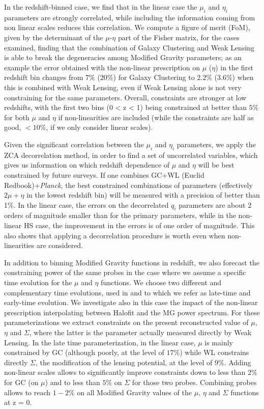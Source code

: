 In the redshift-binned case, we find that in the linear case the $\mu_i$ and $\eta_i$ parameters are strongly correlated, while including the information coming from non linear 
scales reduces this correlation. We compute a figure of merit (FoM), given by the determinant of the $\mu$-$\eta$ part of the Fisher matrix, for the cases examined, finding that 
the combination of Galaxy Clustering and Weak Lensing is able to break the degeneracies among Modified Gravity parameters; as an example the error obtained with the non-linear prescription on $\mu$ ($\eta$) in the first redshift bin changes 
from $7\%$ ($20\%$) for Galaxy Clustering to $2.2\%$ ($3.6\%$) when this is combined with Weak Lensing, even if Weak Lensing alone is not very constraining for the same parameters. 
Overall, constraints are stronger at low redshifts, with the first two bins (0 < z < 1) being constrained at better than $5\%$ for both $\mu$ and $\eta$ if non-linearities are included (while the constraints are half as good, $<10\%$, if we only consider linear scales).

Given the significant correlation between the $\mu_i$ and $\eta_i$ parameters, we apply the ZCA decorrelation method, in order to find a set of uncorrelated 
variables, which gives us information on which redshift dependence of $\mu$ and $\eta$ will be best constrained by future surveys. If one combines GC+WL (Euclid Redbook)+{\it Planck}, the best constrained combinations of parameters (effectively $2\mu+\eta$ in the lowest redshift bin) will be measured with a precision of better than 1\%.
In the linear case, the errors on the decorrelated $q_i$ parameters are about 2 orders of magnitude smaller than for the primary parameters, 
while in the non-linear HS case, the improvement in the errors is of one order of magnitude. This also shows that applying a decorrelation procedure is worth even when non-linearities are considered.

In addition to binning Modified Gravity functions in redshift, we also forecast the constraining power of the same probes in the case where we assume a specific time evolution for the $\mu$ and $\eta$ functions. We choose two different and complementary time evolutions, used in \cite{planck_collaboration_planck_2016} and to which we refer as late-time and early-time evolution. We investigate also in this case the impact of the non-linear prescription interpolating between Halofit and the MG power spectrum. For these parameterizations we 
extract constraints on the present reconstructed value of $\mu$,  $\eta$ and $\Sigma$, where the latter is the parameter actually measured directly by Weak Lensing.  
In the late time parameterization, in the linear case, $\mu$ is mainly constrained by GC (although poorly, at the level of $17\%$) while WL constrains directly $\Sigma$, the modification of the lensing potential, at the level of $9\%$. Adding non-linear scales allows to significantly improve constraints down to less than $2\%$ for GC (on $\mu$) and to less than $5\%$ on $\Sigma$ for those two probes. Combining probes allows to reach $1-2\%$ on all Modified Gravity values of the $\mu$,  $\eta$ and $\Sigma$ functions at z = 0.

